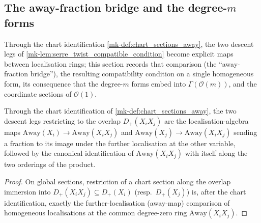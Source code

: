 \subsection{The away-fraction bridge and the degree-\(m\) forms}
\label{mk-subsec:serre_twist_away_bridge}

Through the chart identification \ref{mk-def:chart_sections_away}, the two
descent legs of \ref{mk-lem:serre_twist_compatible_condition} become explicit
maps between localisation rings; this section records that comparison
(the ``away-fraction bridge''), the resulting compatibility condition on a
single homogeneous form, its consequence that the degree-\(m\) forms embed
into \(\Gamma(\mathcal O(m))\), and the coordinate sections of
\(\mathcal O(1)\).

\begin{lemma}\label{mk-lem:serre_twist_away_bridge}
  \leanok

  Through the chart identification of \ref{mk-def:chart_sections_away}, the
  two descent legs restricting to the overlap \(D_+(X_i X_j)\) are the
  localisation-algebra maps \(\mathrm{Away}(X_i) \to \mathrm{Away}(X_i X_j)\)
  and \(\mathrm{Away}(X_j) \to \mathrm{Away}(X_i X_j)\) sending a fraction to
  its image under the further localisation at the other variable, followed
  by the canonical identification of \(\mathrm{Away}(X_i X_j)\) with itself
  along the two orderings of the product.
\end{lemma}
\begin{proof}
  \leanok{}
  On global sections, restriction of a chart section along the overlap
  immersion into \(D_+(X_i X_j) \subseteq D_+(X_i)\) (resp.\ \(D_+(X_j)\)) is,
  after the chart identification, exactly the further-localisation
  (away-map) comparison of homogeneous localisations at the common
  degree-zero ring \(\mathrm{Away}(X_i X_j)\).
\end{proof}

